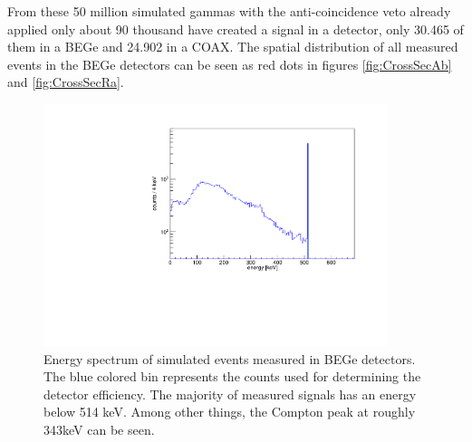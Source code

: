 \documentclass[encoding=utf8,british]{tumphthesis}
\begin{document}
From these 50 million simulated gammas with the anti-coincidence veto already applied only about 90 thousand have created a signal in a detector, only 30.465 of them in a BEGe and 24.902 in a COAX.
The spatial distribution of all measured events in the BEGe detectors can be seen as red dots in figures \ref{fig:CrossSecAb} and \ref{fig:CrossSecRa}.

\begin{figure}[t!]
	\centering
	\ifmakefigures%
	\includegraphics[width=100mm]{./Bilder/MC-514-Phasenraum.pdf}
	\fi%
	\caption{
    Energy spectrum of simulated events measured in BEGe detectors.
	The blue colored bin represents the counts used for determining the detector efficiency.
	The majority of measured signals has an energy below 514 keV.
	Among other things, the Compton peak at roughly 343keV can be seen.  
	}
	\label{fig:PhasenraumMC514}
			\vspace{5mm}
\end{figure}
\end{document}
